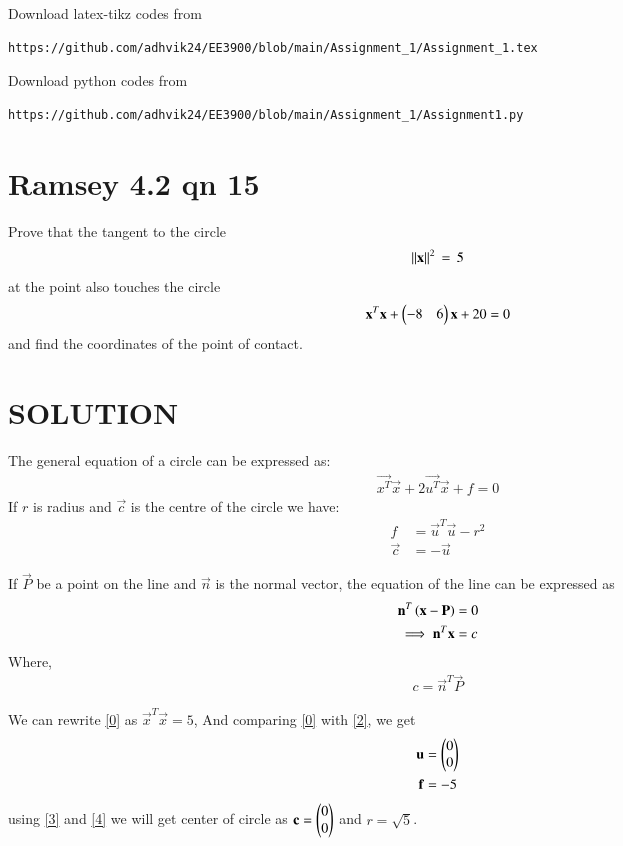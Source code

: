 \documentclass[journal,12pt,twocolumn]{IEEEtran}
\begin{document}
Download latex-tikz codes from 
%
\begin{lstlisting}
https://github.com/adhvik24/EE3900/blob/main/Assignment_1/Assignment_1.tex
\end{lstlisting}
%
Download python codes from 
%
\begin{lstlisting}
https://github.com/adhvik24/EE3900/blob/main/Assignment_1/Assignment1.py
\end{lstlisting}
\section{Ramsey 4.2 qn 15}
Prove that the tangent to the circle 
\begin{align}
    \lVert\mathbf{x}\rVert^2\,=\,5\label{0}
\end{align}
at the point  also touches the circle 
\begin{align}
    \mathbf{x}^T\mathbf{x}+\begin{pmatrix}-8 & 6\end{pmatrix}\mathbf{x}+20 = 0\label{1}
\end{align}
and find the coordinates of the point of
contact.
\section{SOLUTION}
The general equation of a circle can be expressed as:
\begin{align}
\vec{x^T}\vec{x} + 2\vec{u^T}\vec{x} + f = 0 \label{2}
\end{align}
If $r$ is radius and $\vec{c}$ is the centre of the circle we have:
\begin{align}
f &=\vec{u}^T\vec{u}-r^2  \label{3} \\  
\vec{c} &=-\vec{u} \label{4}
\end{align}

If $\vec{P}$ be a point on the line and $\vec{n}$ is the normal vector, the equation of the line can be expressed as
\begin{align}
    {\mathbf{n}}^T\left(\mathbf{x}-\mathbf{P}\right)&=0\label{5}\\
    \implies{\mathbf{n}}^T\mathbf{x}&= c
\end{align}
Where,
\begin{align}
    c= {\vec{n}}^T\vec{P}
\end{align}



We can rewrite \eqref{0} as $\vec{x}^T\vec{x} = 5$, And comparing \eqref{0} with \eqref{2}, we get
\begin{align}
    \mathbf{u}&=\begin{pmatrix}0\\0\end{pmatrix}\\
    \mathbf{f}&=-5
\end{align}
using \eqref{3} and \eqref{4} we will get center of circle as $\mathbf{c} = \begin{pmatrix}0\\0\end{pmatrix}$ and $r= \sqrt{5}$.
\end{document}
